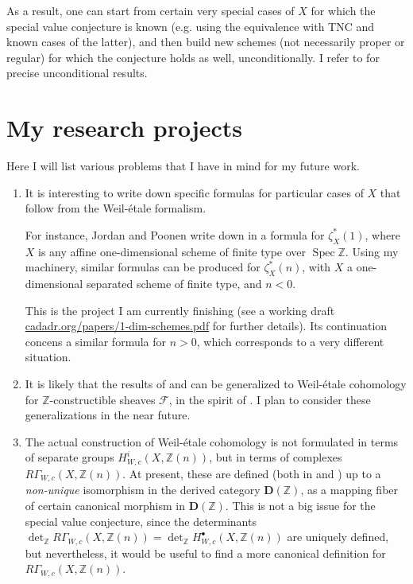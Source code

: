 \documentclass{article}
\DeclareMathOperator{\Spec}{Spec}
\newcommand{\ZZ}{\mathbb{Z}}
\begin{document}
As a result, one can start from certain very special cases of $X$ for which the
special value conjecture is known (e.g. using the equivalence with TNC and known
cases of the latter), and then build new schemes (not necessarily proper or
regular) for which the conjecture holds as well, unconditionally. I refer to
\cite{Weil-etale-preprint-2} for precise unconditional results.

\section{My research projects}

Here I will list various problems that I have in mind for my future work.

\begin{enumerate}
\item It is interesting to write down specific formulas for particular cases of
  $X$ that follow from the Weil-étale formalism.

  For instance, Jordan and Poonen write down in \cite{Jordan-Poonen-2020} a
  formula for $\zeta_X^* (1)$, where $X$ is any affine one-dimensional scheme of
  finite type over $\Spec \ZZ$. Using my machinery, similar formulas can be
  produced for $\zeta_X^* (n)$, with $X$ a one-dimensional separated scheme of
  finite type, and $n < 0$.

  This is the project I am currently finishing (see a working draft
  \href{https://cadadr.org/papers/1-dim-schemes.pdf}{cadadr.org/papers/1-dim-schemes.pdf} for further details).
  Its continuation concens a similar formula for $n > 0$, which corresponds to a
  very different situation.

\item It is likely that the results of \cite{Weil-etale-preprint-1} and
  \cite{Weil-etale-preprint-2} can be generalized to Weil-étale cohomology for
  $\ZZ$-constructible sheaves $\mathcal{F}$, in the spirit of
  \cite{Geisser-Suzuki-2020}. I plan to consider these generalizations in the
  near future.

\item The actual construction of Weil-étale cohomology is not formulated in
  terms of separate groups $H^i_{W,c} (X, \ZZ (n))$, but in terms of complexes
  $R\Gamma_{W,c} (X, \ZZ (n))$. At present, these are defined (both in
  \cite{Flach-Morin-2018} and \cite{Weil-etale-preprint-1}) up to a
  \emph{non-unique} isomorphism in the derived category $\mathbf{D} (\ZZ)$,
  as a mapping fiber of certain canonical morphism in $\mathbf{D} (\ZZ)$.
  This is not a big issue for the special value conjecture, since the
  determinants
  $\det_\ZZ R\Gamma_{W,c} (X, \ZZ (n)) = \det_\ZZ H^\bullet_{W,c} (X, \ZZ(n))$
  are uniquely defined, but nevertheless, it would be useful to find a more
  canonical definition for $R\Gamma_{W,c} (X, \ZZ (n))$.


\end{enumerate}
\end{document}
